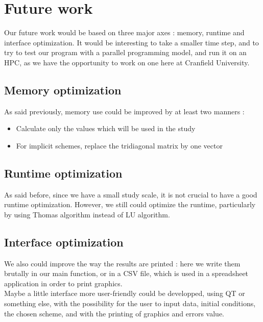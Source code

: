 \documentclass{article}
\begin{document}
        \section{Future work}
            Our future work would be based on three major axes : memory, runtime and interface optimization.
            It would be interesting to take a smaller time step, and to try to test our program
            with a parallel programming model, and run it on an HPC, as we have the opportunity 
            to work on one here at Cranfield University.
            \subsection{Memory optimization}
                As said previously, memory use could be improved by at least two manners :
                \begin{itemize}
                    \item{Calculate only the values which will be used in the study}
                    \item{For implicit schemes, replace the tridiagonal matrix by one vector}
                \end{itemize}
            \subsection{Runtime optimization}
                As said before, since we have a small study scale, it is not crucial to have a good
                runtime optimization. However, we still could optimize the runtime, particularly
                by using Thomas algorithm instead of LU algorithm.
            \subsection{Interface optimization}
                We also could improve the way the results are printed : here we write them brutally
                in our main function, or in a CSV file, which is used in a spreadsheet application
                in order to print graphics.
                \\
                Maybe a little interface more user-friendly could be developped, using QT or something
                else, with the possibility for the user to input data, initial conditions, the chosen
                scheme, and with the printing of graphics and errors value.
    
        \newpage
\end{document}
